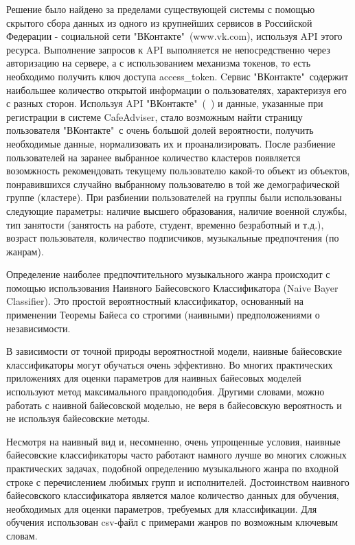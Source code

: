 Решение было найдено за пределами существующей системы с помощью скрытого сбора данных из одного из крупнейших сервисов в Российской Федерации - социальной сети "ВКонтакте"\ (www.vk.com), используя API этого ресурса. Выполнение запросов к API выполняется не непосредственно через авторизацию на сервере, а с использованием механизма токенов, то есть необходимо получить ключ доступа access\_token. Cервис "ВКонтакте"\ содержит наибольшее количество открытой информации о пользователях, характеризуя его с разных сторон. Используя API "ВКонтакте"\ (~\autocite{vkapi}) и данные, указанные при регистрации в системе CafeAdviser, стало возможным найти страницу пользователя "ВКонтакте"\ с очень большой долей вероятности, получить необходимые данные, нормализовать их и проанализировать. После разбиение пользователей на заранее выбранное количество кластеров появляется возомжность рекомендовать текущему пользователю какой-то объект из объектов, понравившихся случайно выбранному пользователю в той же демографической группе (кластере). При разбиении пользователей на группы были использованы следующие параметры: наличие высшего образования, наличие военной службы, тип занятости (занятость на работе, студент, временно безработный и т.д.), возраст пользователя, количество подписчиков, музыкальные предпочтения (по жанрам).

Определение наиболее предпочтительного музыкального жанра происходит с помощью использования Наивного Байесовского Классификатора (Naive Bayer Classifier). Это простой вероятностный классификатор, основанный на применении Теоремы Байеса со строгими (наивными) предположениями о независимости.

В зависимости от точной природы вероятностной модели, наивные байесовские классификаторы могут обучаться очень эффективно. Во многих практических приложениях для оценки параметров для наивных байесовых моделей используют метод максимального правдоподобия. Другими словами, можно работать с наивной байесовской моделью, не веря в байесовскую вероятность и не используя байесовские методы.

Несмотря на наивный вид и, несомненно, очень упрощенные условия, наивные байесовские классификаторы часто работают намного лучше во многих сложных практических задачах, подобной определению музыкального жанра по входной строке с перечислением любимых групп и исполнителей.
Достоинством наивного байесовского классификатора является малое количество данных для обучения, необходимых для оценки параметров, требуемых для классификации.
Для обучения использован csv-файл с примерами жанров по возможным ключевым словам.

